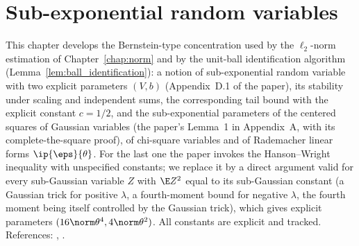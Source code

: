 \chapter{Sub-exponential random variables}
\label{chap:pre_subexp}

This chapter develops the Bernstein-type concentration used by the $\ell_2$-norm estimation
of Chapter~\ref{chap:norm} and by the unit-ball identification algorithm
(Lemma~\ref{lem:ball_identification}): a notion of sub-exponential random variable with two
explicit parameters $(V, b)$ (Appendix~D.1 of the paper), its stability under scaling and
independent sums, the corresponding tail bound with the explicit constant $c = 1/2$, and the
sub-exponential parameters of the centered squares of Gaussian variables (the paper's
Lemma~1 in Appendix~A, with its complete-the-square proof), of chi-square variables and of
Rademacher linear forms $\ip{\eps}{\theta}$. For the last one the paper invokes the
Hanson--Wright inequality with unspecified constants; we replace it by a direct argument valid
for every sub-Gaussian variable $Z$ with $\E Z^2$ equal to its sub-Gaussian constant (a Gaussian
trick for positive $\lambda$, a fourth-moment bound for negative $\lambda$, the fourth moment
being itself controlled by the Gaussian trick), which gives explicit parameters
$(16\norm\theta^4, 4\norm\theta^2)$. All constants are explicit and tracked. References:
\cite[Section~2.7]{vershynin2018high}, \cite[Section~2.4]{boucheron2013concentration}.

